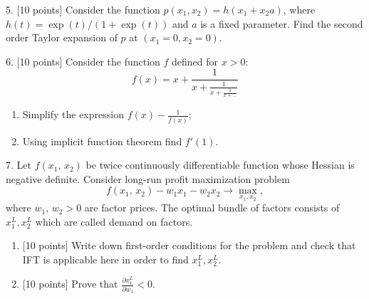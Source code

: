 \documentclass[12pt,a4paper]{article}
\begin{document}
\newpage
{}

5. {[10 points]} Consider the function $p(x_1, x_2) = h(x_1 + x_2 a)$, where $h(t) = \exp(t)/(1+\exp(t))$ and $a$ is a fixed parameter. Find the second order Taylor expansion of $p$ at $(x_1=0, x_2=0)$.

\newpage
{}

6. {[10 points]} Consider the function $f$ defined for $x>0$:
\[
f(x) = x + \frac{1}{x + \frac{1}{x + \frac{1}{x + \ldots}}}
\]
\begin{enumerate}
  \item Simplify the expression $f(x) - \frac{1}{f(x)}$;
  \item Using implicit function theorem find $f'(1)$.
\end{enumerate}




\newpage
{}

7. Let $f({x_1},\,{x_2})$ be twice continuously differentiable function whose Hessian is negative definite. Consider long-run profit maximization problem
\[
f({x_1},\,{x_2}) - {w_1}{x_1} - {w_2}{x_2} \to \max_{x_1, x_2},
\]
where ${w_1},\,{w_2} > 0$ are factor prices. The optimal bundle of factors consists of $x_1^L, x_2^L$ which are called demand on factors.
\begin{enumerate}
\item {[10 points]} Write down first-order conditions for the problem and check that IFT is applicable here in order to find $x_1^L, x_2^L$.
\item {[10 points]} Prove that $\frac{{\partial x_1^L}}{{\partial {w_1}}} < 0$.
\end{enumerate}
\end{document}

